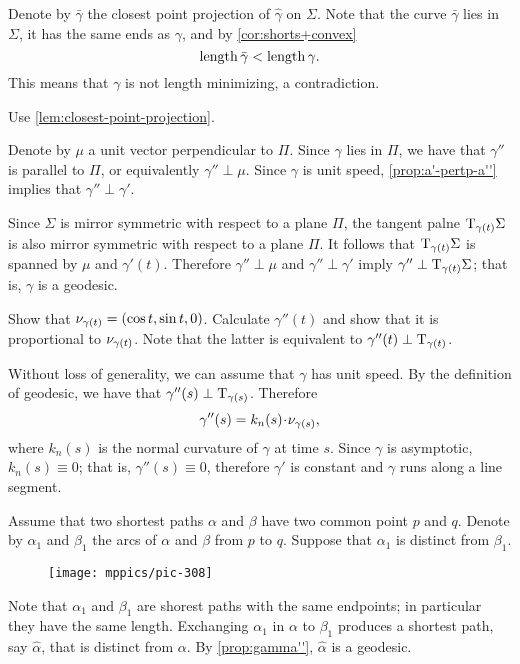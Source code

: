 Denote by $\bar\gamma$ the closest point projection of $\hat\gamma$ on $\Sigma$.
Note that the curve $\bar\gamma$ lies in $\Sigma$, 
it has the same ends as $\gamma$,
and by \ref{cor:shorts+convex}
\[\mathop{\rm length}\nolimits\bar\gamma<\mathop{\rm length}\nolimits\gamma.\]
This means that $\gamma$ is not length minimizing, 
a contradiction.

 Use \ref{lem:closest-point-projection}.

Denote by $\mu$ a unit vector perpendicular to $\Pi$.
Since $\gamma$ lies in $\Pi$, we have that $\gamma''$ is parallel to $\Pi$, or equivalently $\gamma''\perp \mu$.
Since $\gamma$ is unit speed, \ref{prop:a'-pertp-a''} implies that $\gamma''\perp\gamma'$.

Since $\Sigma$ is mirror symmetric with respect to  a plane $\Pi$,
the tangent palne $\mathrm{T}_{\gamma(t)}\Sigma$ is also mirror symmetric with respect to  a plane $\Pi$.
It follows that $\mathrm{T}_{\gamma(t)}\Sigma$ is spanned by $\mu$ and $\gamma'(t)$.
Therefore $\gamma''\perp \mu$ and $\gamma''\perp\gamma'$ imply $\gamma''\perp\mathrm{T}_{\gamma(t)}\Sigma$;
that is, $\gamma$ is a geodesic.

Show that $\nu_{\gamma(t)}=(\cos t,\sin t, 0)$.
Calculate $\gamma''(t)$ and show that it is proportional to $\nu_{\gamma(t)}$.
Note that the latter is equivalent to $\gamma''(t)\perp\mathrm{T}_{\gamma(t)}$.

 Without loss of generality, we can assume that $\gamma$ has unit speed.
By the definition of geodesic, we have that $\gamma''(s)\perp\mathrm{T}_{\gamma(s)}$. 
Therefore 
\[\gamma''(s)=k_n(s)\cdot\Norm_{\gamma(s)},\]
where $k_n(s)$ is the normal curvature of $\gamma$ at time $s$.
Since $\gamma$ is asymptotic, $k_n(s)\equiv 0$;
that is, $\gamma''(s)\equiv 0$, therefore $\gamma'$ is constant and $\gamma$ runs along a line segment.

Assume that two shortest paths $\alpha$ and $\beta$ have two common point $p$ and $q$.
Denote by $\alpha_1$ and $\beta_1$ the arcs of
$\alpha$ and $\beta$ from $p$ to $q$.
Suppose that $\alpha_1$ is distinct from $\beta_1$.

\begin{wrapfigure}{r}{38 mm}
\vskip-0mm
\centering
\texttt{[image: mppics/pic-308]}
\vskip0mm
\end{wrapfigure}

Note that $\alpha_1$ and $\beta_1$ are shorest paths with the same endpoints;
in particular they have the same length.
Exchanging $\alpha_1$ in $\alpha$ to $\beta_1$ produces a shortest path, say $\hat\alpha$, that is distinct from $\alpha$.
By \ref{prop:gamma''}, $\hat\alpha$ is a geodesic.


